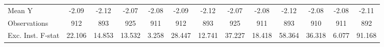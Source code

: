 {\begin{tabular}{l*{12}{c}}
\midrule
Mean Y      &       -2.09         &       -2.12         &       -2.07         &       -2.08         &       -2.09         &       -2.12         &       -2.07         &       -2.08         &       -2.12         &       -2.08         &       -2.08         &       -2.11         \\
Observations&         912         &         893         &         925         &         911         &         912         &         893         &         925         &         911         &         893         &         910         &         911         &         892         \\
Exc. Inst. F-stat&      22.106         &      14.853         &      13.532         &       3.258         &      28.447         &      12.741         &      37.227         &      18.418         &      58.364         &      36.318         &       6.077         &      91.168         \\
\bottomrule
\end{tabular}
}
